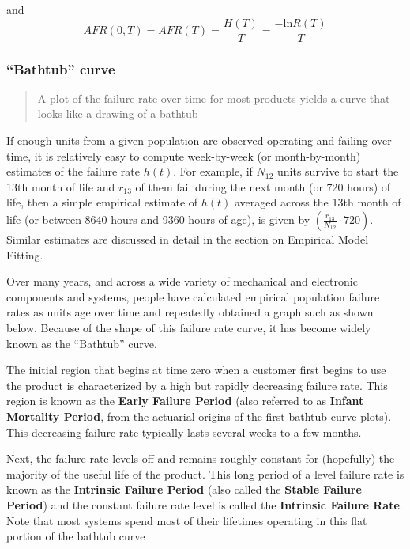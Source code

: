 \documentclass[]{book}
\theoremstyle{definition}
\theoremstyle{definition}
\theoremstyle{definition}
\theoremstyle{remark}
\begin{document}
and \[AFR(0,T) = AFR(T) = \frac{H(T)}{T} = \frac{-\mbox{ln} R(T)}{T}\]

\subsubsection{\texorpdfstring{``Bathtub''
curve}{Bathtub curve}}\label{bathtub-curve}

\begin{quote}
A plot of the failure rate over time for most products yields a curve
that looks like a drawing of a bathtub
\end{quote}

If enough units from a given population are observed operating and
failing over time, it is relatively easy to compute week-by-week (or
month-by-month) estimates of the failure rate \(h(t)\). For example, if
\(N_{12}\) units survive to start the 13th month of life and \(r_{13}\)
of them fail during the next month (or 720 hours) of life, then a simple
empirical estimate of \(h(t)\) averaged across the 13th month of life
(or between 8640 hours and 9360 hours of age), is given by
\((\frac{r_{13}} {N_{12}}⋅720)\). Similar estimates are discussed in
detail in the section on Empirical Model Fitting.

Over many years, and across a wide variety of mechanical and electronic
components and systems, people have calculated empirical population
failure rates as units age over time and repeatedly obtained a graph
such as shown below. Because of the shape of this failure rate curve, it
has become widely known as the ``Bathtub'' curve.

The initial region that begins at time zero when a customer first begins
to use the product is characterized by a high but rapidly decreasing
failure rate. This region is known as the \textbf{Early Failure Period}
(also referred to as \textbf{Infant Mortality Period}, from the
actuarial origins of the first bathtub curve plots). This decreasing
failure rate typically lasts several weeks to a few months.

Next, the failure rate levels off and remains roughly constant for
(hopefully) the majority of the useful life of the product. This long
period of a level failure rate is known as the \textbf{Intrinsic Failure
Period} (also called the \textbf{Stable Failure Period}) and the
constant failure rate level is called the \textbf{Intrinsic Failure
Rate}. Note that most systems spend most of their lifetimes operating in
this flat portion of the bathtub curve
\end{document}
